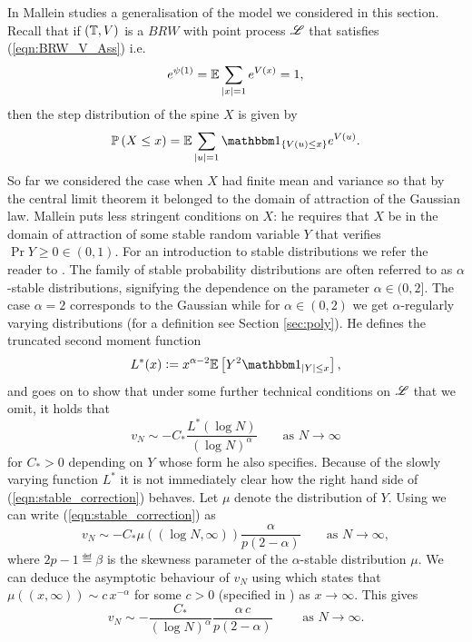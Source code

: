 In \cite[Lemma 4.2]{mallein2018n} Mallein studies a generalisation of the model we considered in this section. Recall that if $(\mathbb{T}, V)$ is a $BRW$ with point process $\mathscr{L}$ that satisfies (\ref{eqn:BRW_V_Ass}) i.e.
\begin{equation}
e^{\psi(1)} = \mathbb{E} \sum\limits_{|x|=1} e^{V(x)} = 1, 
\end{equation}
then the step distribution of the spine $X$ is given by
\begin{equation}
\Pr{X \leq x} = \E \sum\limits_{|u| = 1} \Ind_{\{V(u) \leq x\}} e^{V(u)}. 
\end{equation}
So far we considered the case when $X$ had finite mean and variance so that by the central limit theorem it belonged to the domain of attraction of the Gaussian law. Mallein puts less stringent conditions on $X$: he requires that $X$ be in the domain of attraction of some stable random variable $Y$ that verifies $\Pr{Y \geq 0} \in (0, 1)$. For an introduction to stable distributions we refer the reader to \cite[Section XVII]{feller1957introduction}. The family of stable probability distributions are often referred to as $\alpha$-stable distributions, signifying the dependence on the parameter $\alpha \in (0, 2]$. The case $\alpha = 2$ corresponds to the Gaussian while for $\alpha \in (0, 2)$ we get $\alpha$-regularly varying distributions (for a definition see Section \ref{sec:poly}). He defines the truncated second moment function
\begin{equation}
L^*(x) \defeq x^{\alpha - 2} \Ex{Y^2 \Ind_{|Y| \leq x}}, 
\end{equation}
and goes on to show that under some further technical conditions on $\mathscr{L}$ that we omit, it holds that 
\begin{equation}\label{eqn:stable_correction}
v_N \sim - C_* \frac{L^*(\log N)}{(\log N)^\alpha} \qquad\text{as } N \to \infty
\end{equation}
for $C_* > 0$ depending on $Y$ whose form he also specifies. Because of the slowly varying function $L^*$ it is not immediately clear how the right hand side of (\ref{eqn:stable_correction}) behaves. Let $\mu$ denote the distribution of $Y$. Using \cite[Section XVII, (5.18) and (5.22)]{feller1957introduction} we can write (\ref{eqn:stable_correction}) as 
\begin{equation}\label{eqn:example_ppp2}
v_N \sim - C_* \mu((\log N, \infty)) \frac{\alpha}{p(2 - \alpha)} \qquad\text{as } N \to \infty, 
\end{equation}
where $2p - 1 \eqdef \beta$ is the skewness parameter of the $\alpha$-stable distribution $\mu$. We can deduce the asymptotic behaviour of $v_N$ using \cite[Theorem 1.12]{nolan2003stable} which states that $\mu((x, \infty)) \sim c\,x^{-\alpha}$ for some $c > 0$ (specified in \cite{nolan2003stable}) as $x \to \infty$. This gives 
\begin{equation}
v_N \sim - \frac{C_*}{(\log N)^\alpha} \frac{\alpha\,c}{p(2 - \alpha)} \qquad\text{ as }N \to \infty. 
\end{equation}






\newpage